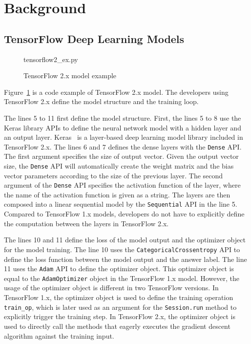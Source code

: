 \section{Background}\label{sec:background}

\subsection{TensorFlow Deep Learning Models}


\begin{figure}[ht!]

{tensorflow2_ex.py}
  \caption{TensorFlow 2.x model example}
\label{fig:back:tf2}
\end{figure}

Figure~\ref{fig:back:tf2} is a code example of TensorFlow 2.x model.
The developers using TensorFlow 2.x define the model structure and the training
loop. 

The lines 5 to 11 first define the model structure.
First, the lines 5 to 8 use the Keras library APIs to define the neural
network model with a hidden layer and an output layer.
Keras~\cite{keras} is a layer-based deep learning model library included in 
TensorFlow 2.x. The lines 6 and 7 defines the dense layers with the {\tt Dense} 
API. The first argument specifies the size of output vector.
Given the output vector size, the {\tt Dense} API will automatically create
the weight matrix and the bias vector parameters according to the size of 
the previous layer. The second argument of the {\tt Dense} API 
specifies the activation function of the layer,
where the name of the activation function is given as a string. 
The layers are then composed into a linear sequential model
by the {\tt Sequential} API in the line 5.
Compared to TensorFlow 1.x models, developers do not have to explicitly
define the computation between the layers in TensorFlow 2.x.

The lines 10 and 11 define the loss of the model output and
the optimizer object for the model training.
The line 10 uses the {\tt CategoricalCrossentropy} API to 
define the loss function between the model output and the answer label.
The line 11 uses the {\tt Adam} API to define the optimizer object.
This optimizer object is equal to the {\tt AdamOptimizer} object in the 
TensorFlow 1.x model.
However, the usage of the optimizer object is different in two TensorFlow
versions.
In TensorFlow 1.x, the optimizer object is used to define the
training operation {\tt train\_op}, which is later used as an argument
for the {\tt Session.run} method to explicitly trigger the training step.
In TensorFlow 2.x, the optimizer object is used to directly call the methods 
that eagerly executes the gradient descent algorithm against the training input. 


